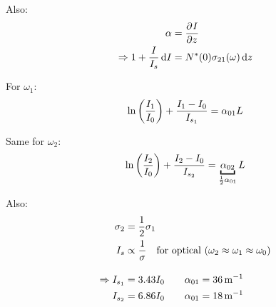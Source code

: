 \begin{parts}
	Also:
	\begin{align*}
		\alpha &= \frac{\partial^{}{I}}{\partial{}{z}^{}} \\
		\Rightarrow 1 + \frac{I}{I_s} \,\mathrm{d}{I} &= N^*(0) \sigma_{21} (\omega) \,\mathrm{d}{z}
	\end{align*}
	
	For $\omega_1$:
	\begin{equation*}
		\ln\left(\frac{I_1}{I_0}\right) + \frac{I_1 - I_0}{I_{s_1}} = \alpha_{01} L
	\end{equation*}
	
	Same for $\omega_2$:
	\begin{equation*}
		\ln\rbracket{\frac{I_2}{I_0}} + \frac{I_2 - I_0}{I_{s_2}} = \underbracket{\alpha_{02}}_{\frac{1}{2}\alpha_{01}} L
	\end{equation*}
	
	Also:
	\begin{align*}
		\sigma_2 &= \frac{1}{2} \sigma_1 \\
		I_s &\propto \frac{1}{\sigma} \textnormal{\hspace{1em}for optical } (\omega_2 \approx \omega_1 \approx \omega_0) \\[1em]
		\Rightarrow I_{s_1} &= \num{3.43} I_0 \qquad \alpha_{01} = \SI{36}{\per\metre} \\
		I_{s_2} &= \num{6.86} I_0 \qquad \alpha_{01} = \SI{18}{\per\metre}
	\end{align*}
\end{parts}
